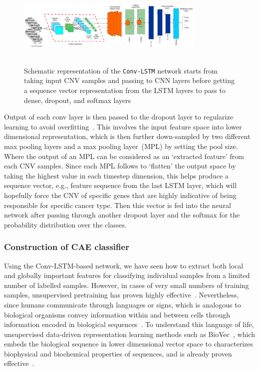\begin{figure}
	\centering
	\includegraphics[width=0.80\textwidth,height=40mm]{images/conv_lstm.png}	 
	\caption{Schematic representation of the \texttt{Conv-LSTM} network starts from taking input CNV samples and passing to CNN layers before getting a sequence vector representation from the LSTM layers to pass to dense, dropout, and softmax layers~\cite{karimACCA2019}}	
	\label{fig:conv_lstm}
	\vspace{-2mm}
\end{figure}

\hspace*{3.5mm} Output of each conv layer is then passed to the dropout layer to regularize learning to avoid overfitting~\cite{vardropout}. This involves the input feature space into lower dimensional representation, which is then further down-sampled by two different max pooling layers and a max pooling layer~(MPL) by setting the pool size. Where the output of an MPL can be considered as an `extracted feature' from each CNV samples. Since each MPL follows to `flatten' the output space by taking the highest value in each timestep dimension, this helps produce a sequence vector, e.g., feature sequence from the last LSTM layer, which will hopefully force the CNV of specific genes that are highly indicative of being responsible for specific cancer type. Then this vector is fed into the neural network after passing through another dropout layer and the softmax for the probability distribution over the classes. 

\subsubsection{Construction of CAE classifier}
Using the Conv-LSTM-based network, we have seen how to extract both local and globally important features for classifying individual samples from a limited number of labelled samples. However, in cases of very small numbers of training samples, unsupervised pretraining has proven highly effective~\cite{ae1,ae2,ae3}. 
Nevertheless, since humans communicate through languages or signs, which is analogous to biological organisms convey information within and between cells through information encoded in biological sequences~\cite{yue2018deep}. To understand this language of life, unsupervised data-driven representation learning methods such as BioVec~\cite{asgari2015continuous}, which embeds the biological sequence in lower dimensional vector space to characterizes biophysical and biochemical properties of sequences, and is already proven effective~\cite{yue2018deep}. 

